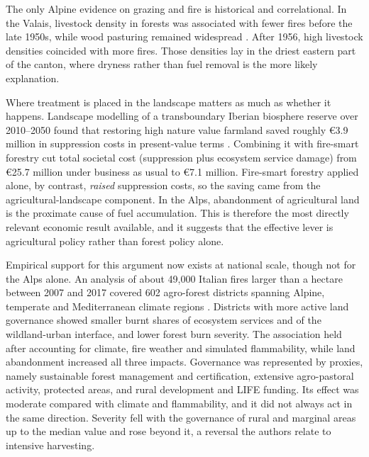 \documentclass[11pt,a4paper]{article}
\begin{document}
The only Alpine evidence on grazing and fire is historical and correlational. In the Valais, livestock density in forests was associated with fewer fires before the late 1950s, while wood pasturing remained widespread \citep{zumbrunnen_human_2012}. After 1956, high livestock densities coincided with more fires. Those densities lay in the driest eastern part of the canton, where dryness rather than fuel removal is the more likely explanation.

Where treatment is placed in the landscape matters as much as whether it happens. Landscape modelling of a transboundary Iberian biosphere reserve over 2010--2050 found that restoring high nature value farmland saved roughly €3.9 million in suppression costs in present-value terms \citep{lecinadiaz_incorporating_2023}. Combining it with fire-smart forestry cut total societal cost (suppression plus ecosystem service damage) from €25.7 million under business as usual to €7.1 million. Fire-smart forestry applied alone, by contrast, \emph{raised} suppression costs, so the saving came from the agricultural-landscape component. In the Alps, abandonment of agricultural land is the proximate cause of fuel accumulation. This is therefore the most directly relevant economic result available, and it suggests that the effective lever is agricultural policy rather than forest policy alone.

Empirical support for this argument now exists at national scale, though not for the Alps alone. An analysis of about 49{,}000 Italian fires larger than a hectare between 2007 and 2017 covered 602 agro-forest districts spanning Alpine, temperate and Mediterranean climate regions \citep{spadoni_active_2023}. Districts with more active land governance showed smaller burnt shares of ecosystem services and of the wildland-urban interface, and lower forest burn severity. The association held after accounting for climate, fire weather and simulated flammability, while land abandonment increased all three impacts. Governance was represented by proxies, namely sustainable forest management and certification, extensive agro-pastoral activity, protected areas, and rural development and LIFE funding. Its effect was moderate compared with climate and flammability, and it did not always act in the same direction. Severity fell with the governance of rural and marginal areas up to the median value and rose beyond it, a reversal the authors relate to intensive harvesting.
\end{document}

